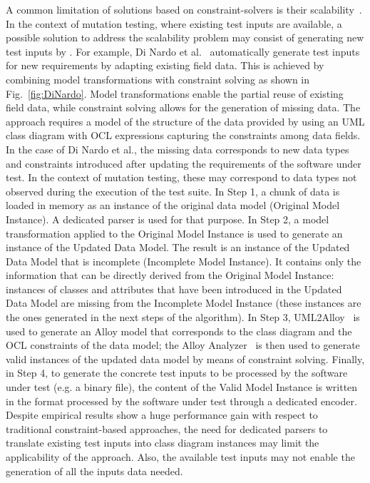 A common limitation of solutions based on constraint-solvers is their scalability~\cite{di2017augmenting}. In the context of mutation testing, where existing test inputs are available, a possible solution to address the scalability problem may consist of generating new test inputs by .
For example, Di Nardo et al.~\cite{di2017augmenting} automatically generate test inputs for new requirements by adapting existing field data.
This is achieved by combining model transformations with constraint solving as shown in Fig.~\ref{fig:DiNardo}.
Model transformations enable the partial reuse of existing field data, while constraint solving allows for the generation of missing data. The approach requires a model of the structure of the data provided by using an UML class diagram with OCL expressions capturing the constraints among data fields. In the case of Di Nardo et al., the missing data corresponds to new data types and constraints introduced after updating the requirements of the software under test. In the context of mutation testing, these may correspond to data types not observed during the execution of the test suite.
In Step 1, a chunk of data is loaded in memory as an instance of the original data model (Original Model Instance).
A dedicated parser is used for that purpose.
In Step 2, a model transformation applied to the Original Model Instance is used to generate an instance of the Updated Data Model. The result is an instance of the Updated Data Model that is incomplete (Incomplete Model Instance).
It contains only the information that can be directly derived from the Original Model Instance:
instances of classes and attributes that have been introduced in the Updated Data Model are missing from the Incomplete Model Instance (these instances are the ones generated in the next steps of the algorithm).
In Step 3, UML2Alloy~\cite{Uml2alloy} is used to generate an Alloy model that corresponds to the class diagram and the OCL constraints of the data model; the Alloy Analyzer~\cite{AlloyWeb} is then used to generate  valid instances of the updated data model by means of constraint solving. 
Finally, in Step 4, to generate the concrete test inputs to be processed by the software under test (e.g. a binary file), the content of the Valid Model Instance is written in the format processed by the software under test through a dedicated encoder.
Despite empirical results show a huge performance gain with respect to traditional constraint-based approaches, the need for dedicated parsers to translate existing test inputs into class diagram instances may limit the applicability of the approach. Also, the available test inputs may not enable the generation of all the inputs data needed.

